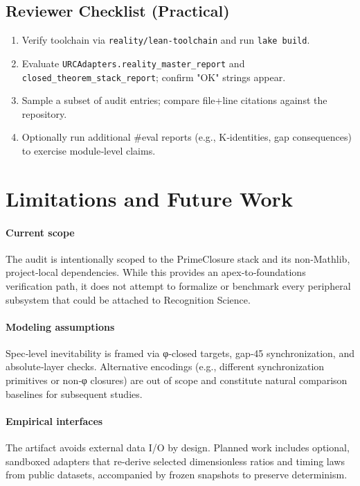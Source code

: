\documentclass{article}
\begin{document}
\subsection{Reviewer Checklist (Practical)}
\begin{enumerate}[leftmargin=*]
  \item Verify toolchain via \texttt{reality/lean-toolchain} and run \texttt{lake build}.
  \item Evaluate \texttt{URCAdapters.reality\_master\_report} and \texttt{closed\_theorem\_stack\_report}; confirm "OK" strings appear.
  \item Sample a subset of audit entries; compare file+line citations against the repository.
  \item Optionally run additional #eval reports (e.g., K‑identities, gap consequences) to exercise module‑level claims.
\end{enumerate}

\section{Limitations and Future Work}
\paragraph{Current scope} The audit is intentionally scoped to the PrimeClosure stack and its non‑Mathlib, project‑local dependencies. While this provides an apex‑to‑foundations verification path, it does not attempt to formalize or benchmark every peripheral subsystem that could be attached to Recognition Science.

\paragraph{Modeling assumptions} Spec‑level inevitability is framed via φ‑closed targets, gap‑45 synchronization, and absolute‑layer checks. Alternative encodings (e.g., different synchronization primitives or non‑φ closures) are out of scope and constitute natural comparison baselines for subsequent studies.

\paragraph{Empirical interfaces} The artifact avoids external data I/O by design. Planned work includes optional, sandboxed adapters that re‑derive selected dimensionless ratios and timing laws from public datasets, accompanied by frozen snapshots to preserve determinism.
\end{document}
